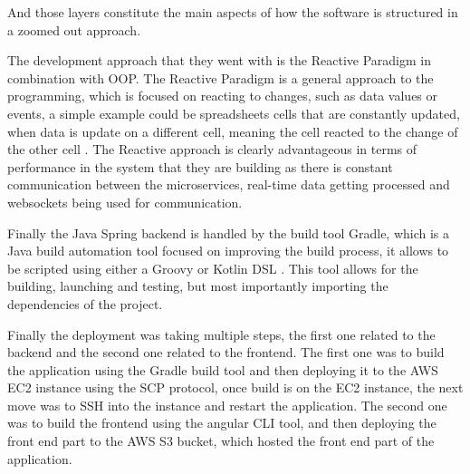 And those layers constitute the main aspects of how the software is structured in
a zoomed out approach.

The development approach that they went with is the Reactive Paradigm in combination
with OOP. The Reactive Paradigm is a general approach to the programming, which is focused 
on reacting to changes, such as data values or events, a simple example could be spreadsheets
cells that are constantly updated, when data is update on a different cell, meaning the 
cell reacted to the change of the other cell \cite{reactive_programming}.
The Reactive approach is clearly advantageous in terms of performance in the system
that they are building as there is constant communication between the microservices,
real-time data getting processed and websockets being used for communication.

Finally the Java Spring backend is handled by the build tool Gradle, which is a
Java build automation tool focused on improving the build process, it allows to be scripted
using either a Groovy or Kotlin DSL \cite{gradle_def}.
This tool allows for the building, launching and testing, but most importantly importing 
the dependencies of the project.

Finally the deployment was taking multiple steps, the first one related to the backend
and the second one related to the frontend. The first one was to build the application
using the Gradle build tool and then deploying it to the AWS EC2 instance using the 
SCP protocol, once build is on the EC2 instance, the next move was to SSH into the 
instance and restart the application. The second one was to build the frontend using
the angular CLI tool, and then deploying the front end part to the AWS S3 bucket,
which hosted the front end part of the application.

